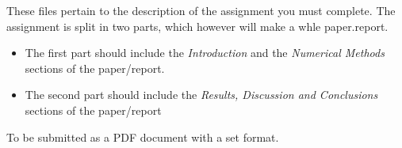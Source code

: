 \documentclass[class=report, crop=false, 12pt,a4paper]{standalone}
\begin{document}
These files pertain to the description of the assignment you must complete. The assignment is split in two parts, which however will make a whle paper.report.
\begin{itemize}
	\item The first part should include the \textit{Introduction} and the \textit{Numerical Methods} sections of the paper/report.
	\item The second part should include the \textit{Results, Discussion and Conclusions} sections of the paper/report
\end{itemize}
To be submitted as a PDF document with a set format. 
\end{document}
